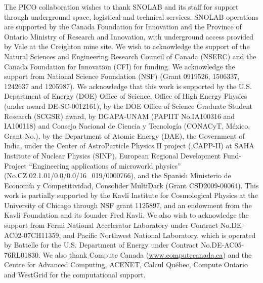 \documentclass[10pt]{article}
\begin{document}
The PICO collaboration wishes to thank SNOLAB and its staff for support through underground space, logistical and technical services. SNOLAB operations are supported by the Canada Foundation for Innovation and the Province of Ontario Ministry of Research and Innovation, with underground access provided by Vale at the Creighton mine site. We wish to acknowledge the support of the Natural Sciences and Engineering Research Council of Canada (NSERC) and the Canada Foundation for Innovation (CFI) for funding. We acknowledge the support from National Science Foundation (NSF) (Grant 0919526, 1506337, 1242637 and 1205987). We acknowledge that this work is supported by the U.S. Department of Energy (DOE) Office of Science, Office of High Energy Physics (under award DE-SC-0012161), by the DOE Office of Science Graduate Student Research (SCGSR) award,  by DGAPA-UNAM (PAPIIT No.\:IA100316 and IA100118) and Consejo Nacional de Ciencia y Tecnolog\'ia (CONACyT, M\'exico, Grant No.), by the Department of Atomic Energy (DAE), the Government of India, under the Center of AstroParticle Physics II project (,CAPP-II) at SAHA Institute of Nuclear Physics (SINP), European Regional Development Fund-Project ``Engineering applications of microworld physics'' (No.\:CZ.02.1.01/0.0/0.0/16\_019/0000766), 
and the Spanish Ministerio de Econom\'ia y Competitividad, Consolider MultiDark (Grant CSD2009-00064). This work is partially supported by the Kavli Institute for Cosmological Physics at the University of Chicago through NSF grant 1125897, and an endowment from the Kavli Foundation and its founder Fred Kavli. We also wish to acknowledge the support from Fermi National Accelerator Laboratory under Contract No.\:DE-AC02-07CH11359, and Pacific Northwest National Laboratory, which is operated by Battelle for the U.S. Department of Energy under Contract No.\:DE-AC05-76RL01830. We also thank Compute Canada (\url{www.computecanada.ca}) and the Centre for Advanced Computing, ACENET, Calcul Qu\'ebec, Compute Ontario and WestGrid for the computational support.

\printbibliography
\end{document}

